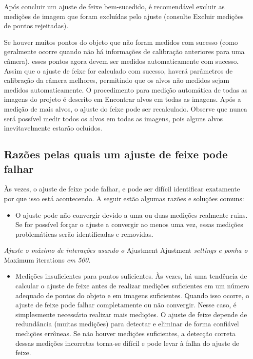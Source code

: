 \documentclass[
  12pt,
  letterpaper,
  DIV=11,
  numbers=noendperiod]{scrreprt}
\providecommand{\tightlist}{%
  \setlength{\itemsep}{0pt}\setlength{\parskip}{0pt}}
\begin{document}
Após concluir um ajuste de feixe bem-sucedido, é recomendável excluir as
medições de imagem que foram excluídas pelo ajuste (consulte Excluir
medições de pontos rejeitadas).

Se houver muitos pontos do objeto que não foram medidos com sucesso
(como geralmente ocorre quando não há informações de calibração
anteriores para uma câmera), esses pontos agora devem ser medidos
automaticamente com sucesso. Assim que o ajuste de feixe for calculado
com sucesso, haverá parâmetros de calibração da câmera melhores,
permitindo que os alvos não medidos sejam medidos automaticamente. O
procedimento para medição automática de todas as imagens do projeto é
descrito em Encontrar alvos em todas as imagens. Após a medição de mais
alvos, o ajuste do feixe pode ser recalculado. Observe que nunca será
possível medir todos os alvos em todas as imagens, pois alguns alvos
inevitavelmente estarão ocluídos.

\subsection{Razões pelas quais um ajuste de feixe pode
falhar}\label{razuxf5es-pelas-quais-um-ajuste-de-feixe-pode-falhar}

Às vezes, o ajuste de feixe pode falhar, e pode ser difícil identificar
exatamente por que isso está acontecendo. A seguir estão algumas razões
e soluções comuns:

\begin{itemize}
\tightlist
\item
  O ajuste pode não convergir devido a uma ou duas medições realmente
  ruins. Se for possível forçar o ajuste a convergir ao menos uma vez,
  essas medições problemáticas serão identificadas e removidas.
\end{itemize}

\emph{Ajuste o máximo de interações usando o} Ajustment \textbar{}
Ajustment \emph{settings e ponha o} Maximum iterations \emph{em 500.}

\begin{itemize}
\tightlist
\item
  Medições insuficientes para pontos suficientes. Às vezes, há uma
  tendência de calcular o ajuste de feixe antes de realizar medições
  suficientes em um número adequado de pontos do objeto e em imagens
  suficientes. Quando isso ocorre, o ajuste de feixe pode falhar
  completamente ou não convergir. Nesse caso, é simplesmente necessário
  realizar mais medições. O ajuste de feixe depende de redundância
  (muitas medições) para detectar e eliminar de forma confiável medições
  errôneas. Se não houver medições suficientes, a detecção correta
  dessas medições incorretas torna-se difícil e pode levar à falha do
  ajuste de feixe.
\end{itemize}
\end{document}
